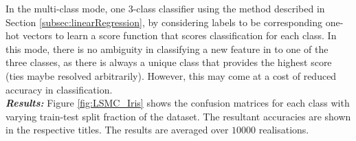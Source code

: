 \documentclass[12pt, a4 paper]{article}
\begin{document}
\label{prob:2.ii}

In the multi-class mode, one $3$-class classifier using the method described in Section \ref{subsec:linearRegression}, by considering labels to be corresponding one-hot vectors to learn a score function that scores classification for each class. In this mode, there is no ambiguity in classifying a new feature in to one of the three classes, as there is always a unique class that provides the highest score (ties maybe resolved arbitrarily). However, this may come at a cost of reduced accuracy in classification. \\

{\it \bfseries Results:} Figure \ref{fig:LSMC_Iris} shows the confusion matrices for each class with varying train-test split fraction of the dataset. The resultant accuracies are shown in the respective titles. The results are averaged over $10000$ realisations. \\
\end{document}
